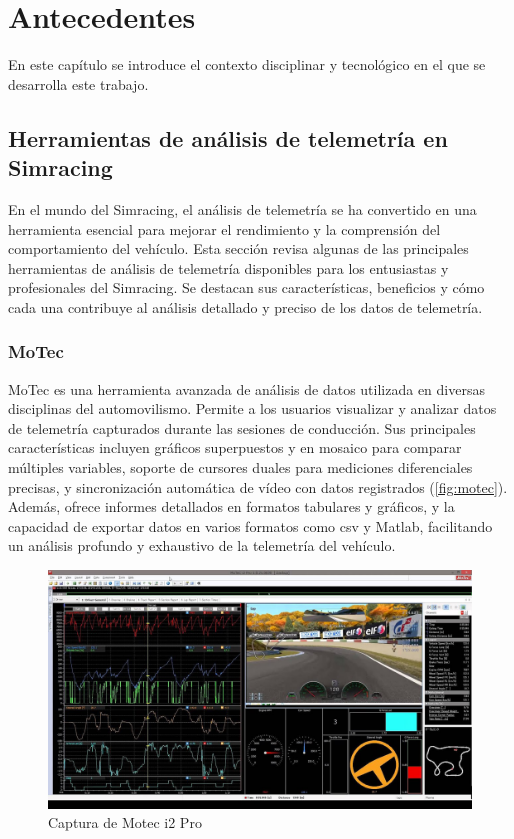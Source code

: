\chapter{Antecedentes}
\label{cap:Antecedentes}
En este capítulo se introduce el contexto disciplinar y tecnológico en el que se desarrolla este trabajo.

\section{Herramientas de análisis de telemetría en Simracing}
En el mundo del Simracing, el análisis de telemetría se ha convertido en una herramienta esencial para mejorar el rendimiento y la comprensión del comportamiento del vehículo. Esta sección revisa algunas de las principales herramientas de análisis de telemetría disponibles para los entusiastas y profesionales del Simracing. Se destacan sus características, beneficios y cómo cada una contribuye al análisis detallado y preciso de los datos de telemetría.

\subsection{MoTec}
MoTec \cite{motec} es una herramienta avanzada de análisis de datos utilizada en diversas disciplinas del automovilismo. Permite a los usuarios visualizar y analizar datos de telemetría capturados durante las sesiones de conducción. Sus principales características incluyen gráficos superpuestos y en mosaico para comparar múltiples variables, soporte de cursores duales para mediciones diferenciales precisas, y sincronización automática de vídeo con datos registrados (\autoref{fig:motec}). Además, ofrece informes detallados en formatos tabulares y gráficos, y la capacidad de exportar datos en varios formatos como \ac{csv} y Matlab, facilitando un análisis profundo y exhaustivo de la telemetría del vehículo.
\begin{figure}[H]
	\centering
	\includegraphics[width=0.6\linewidth]{./figs/herramientas/analisis/motec.png}
	\caption[Captura de Motec i2 Pro]{Captura de Motec i2 Pro \cite{motec_cap}}
    \label{fig:motec}
\end{figure}

